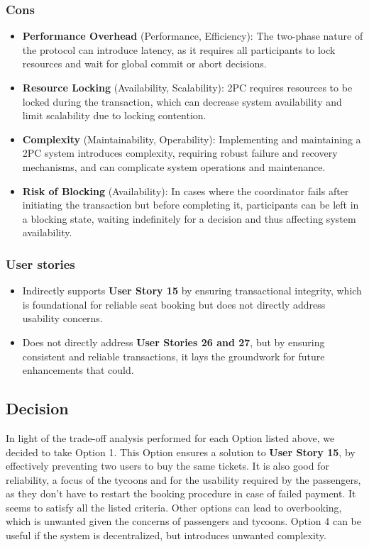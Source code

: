 \subsubsection*{Cons}
\begin{itemize}[noitemsep]
    \item \textbf{Performance Overhead} (Performance, Efficiency): The two-phase nature of the protocol can introduce latency, as it requires all participants to lock resources and wait for global commit or abort decisions.
    \item \textbf{Resource Locking} (Availability, Scalability): 2PC requires resources to be locked during the transaction, which can decrease system availability and limit scalability due to locking contention.
    \item \textbf{Complexity} (Maintainability, Operability): Implementing and maintaining a 2PC system introduces complexity, requiring robust failure and recovery mechanisms, and can complicate system operations and maintenance.
    \item \textbf{Risk of Blocking} (Availability): In cases where the coordinator fails after initiating the transaction but before completing it, participants can be left in a blocking state, waiting indefinitely for a decision and thus affecting system availability.
\end{itemize}
\subsubsection*{User stories}
\begin{itemize}
    \item Indirectly supports \textbf{User Story 15} by ensuring transactional integrity, which is foundational for reliable seat booking but does not directly address usability concerns.
    \item Does not directly address \textbf{User Stories 26 and 27}, but by ensuring consistent and reliable transactions, it lays the groundwork for future enhancements that could.
\end{itemize}

\subsection*{Decision}
In light of the trade-off analysis performed for each Option listed above, we decided to take Option 1. 
This Option ensures a solution to \textbf{User Story 15}, by effectively preventing two users to buy the same tickets. 
It is also good for reliability, a focus of the tycoons and for the usability required by the passengers, as they don't have to restart the booking procedure in case of failed payment. It seems to satisfy all the listed criteria.
Other options can lead to overbooking, which is unwanted given the concerns of passengers and tycoons.
Option 4 can be useful if the system is decentralized, but introduces unwanted complexity.


